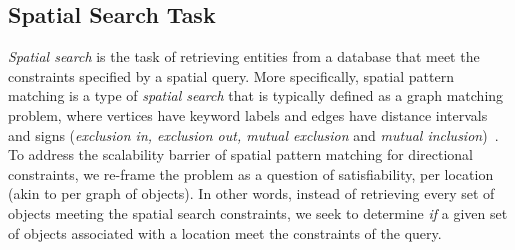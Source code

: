 \subsection{Spatial Search Task}
\par{
    \textit{Spatial search} is the task of retrieving entities from a database that meet the constraints specified by a spatial query.
    More specifically, spatial pattern matching is a type of \textit{spatial search} that is typically defined as a graph matching problem, where vertices have keyword labels and edges have distance intervals and signs (\textit{exclusion in, exclusion out, mutual exclusion} and \textit{mutual inclusion})~\cite{Fang2019}.
    To address the scalability barrier of spatial pattern matching for directional constraints, we re-frame the problem as a question of satisfiability, per location (akin to per graph of objects).
    In other words, instead of retrieving every set of objects meeting the spatial search constraints, we seek to determine \emph{if} a given set of objects associated with a location meet the constraints of the query.
    

}








